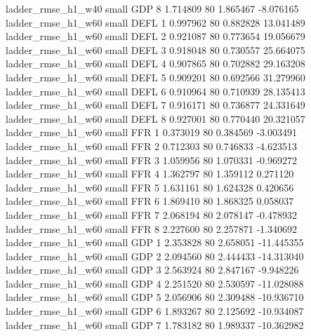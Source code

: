       ladder_rmse_h1_w40      small      GDP                 8 1.714809 80       1.865467          -8.076165
      ladder_rmse_h1_w60      small     DEFL                 1 0.997962 80       0.882828          13.041489
      ladder_rmse_h1_w60      small     DEFL                 2 0.921087 80       0.773654          19.056679
      ladder_rmse_h1_w60      small     DEFL                 3 0.918048 80       0.730557          25.664075
      ladder_rmse_h1_w60      small     DEFL                 4 0.907865 80       0.702882          29.163208
      ladder_rmse_h1_w60      small     DEFL                 5 0.909201 80       0.692566          31.279960
      ladder_rmse_h1_w60      small     DEFL                 6 0.910964 80       0.710939          28.135413
      ladder_rmse_h1_w60      small     DEFL                 7 0.916171 80       0.736877          24.331649
      ladder_rmse_h1_w60      small     DEFL                 8 0.927001 80       0.770440          20.321057
      ladder_rmse_h1_w60      small      FFR                 1 0.373019 80       0.384569          -3.003491
      ladder_rmse_h1_w60      small      FFR                 2 0.712303 80       0.746833          -4.623513
      ladder_rmse_h1_w60      small      FFR                 3 1.059956 80       1.070331          -0.969272
      ladder_rmse_h1_w60      small      FFR                 4 1.362797 80       1.359112           0.271120
      ladder_rmse_h1_w60      small      FFR                 5 1.631161 80       1.624328           0.420656
      ladder_rmse_h1_w60      small      FFR                 6 1.869410 80       1.868325           0.058037
      ladder_rmse_h1_w60      small      FFR                 7 2.068194 80       2.078147          -0.478932
      ladder_rmse_h1_w60      small      FFR                 8 2.227600 80       2.257871          -1.340692
      ladder_rmse_h1_w60      small      GDP                 1 2.353828 80       2.658051         -11.445355
      ladder_rmse_h1_w60      small      GDP                 2 2.094560 80       2.444433         -14.313040
      ladder_rmse_h1_w60      small      GDP                 3 2.563924 80       2.847167          -9.948226
      ladder_rmse_h1_w60      small      GDP                 4 2.251520 80       2.530597         -11.028088
      ladder_rmse_h1_w60      small      GDP                 5 2.056906 80       2.309488         -10.936710
      ladder_rmse_h1_w60      small      GDP                 6 1.893267 80       2.125692         -10.934087
      ladder_rmse_h1_w60      small      GDP                 7 1.783182 80       1.989337         -10.362982
